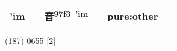 \documentclass[14pt,a4paper]{scrartcl}
\begin{document}
\begin{longtable}[c]{@{}llllll@{}}
\begin{minipage}[t]{0.14\columnwidth}\raggedright\strut
'im
\strut\end{minipage} &
\begin{minipage}[t]{0.14\columnwidth}\raggedright\strut
\strut\end{minipage} &
\begin{minipage}[t]{0.14\columnwidth}\raggedright\strut
音\textsuperscript{97f3~'im}
\strut\end{minipage} &
\begin{minipage}[t]{0.14\columnwidth}\raggedright\strut
\strut\end{minipage} &
\begin{minipage}[t]{0.14\columnwidth}\raggedright\strut
pure:other
\strut\end{minipage}\tabularnewline
\bottomrule
\end{longtable}

(187) 0655 {[}2{]}
\end{document}
